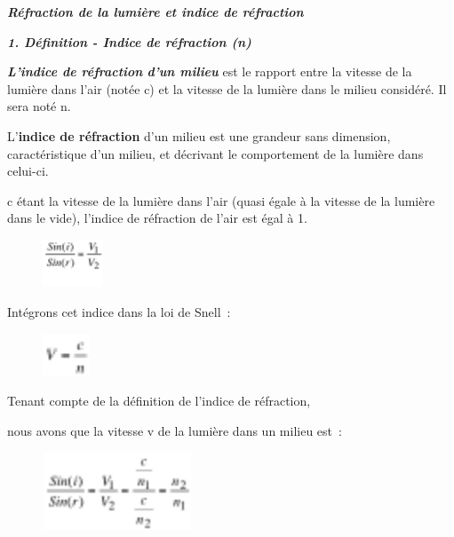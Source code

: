 \emph{\textbf{Réfraction de la lumière et indice de réfraction}}

\emph{\textbf{1. Définition - Indice de réfraction (n) ~ }}

\emph{\textbf{L'indice de réfraction} \textbf{d'un milieu}} est le
rapport entre la vitesse de la lumière dans l'air (notée c) et la
vitesse de la lumière dans le milieu considéré. Il sera noté n.

L'\textbf{indice de réfraction} d'un milieu est une grandeur sans
dimension, caractéristique d'un milieu, et décrivant le comportement de
la lumière dans celui-ci.

c étant la vitesse de la lumière dans l'air (quasi égale à la vitesse de
la lumière dans le vide), l'indice de réfraction de l'air est égal à 1.

\begin{figure}
\centering
\includegraphics[width=1.804cm,height=1.413cm]{Pictures/100000010000002B00000022B156AA6818DBA2EC.png}
\caption{}
\end{figure}

Intégrons cet indice dans la loi de Snell~:

\begin{figure}
\centering
\includegraphics[width=1.399cm,height=1.268cm]{Pictures/100000010000001700000015C406BF942DA0A30B.png}
\caption{}
\end{figure}

Tenant compte de la définition de l'indice de réfraction,

nous avons que la vitesse v de la lumière dans un milieu est~:

\begin{figure}
\centering
\includegraphics[width=4.445cm,height=2.328cm]{Pictures/10000001000000530000002C34DF98E92A29FA75.png}
\caption{}
\end{figure}


